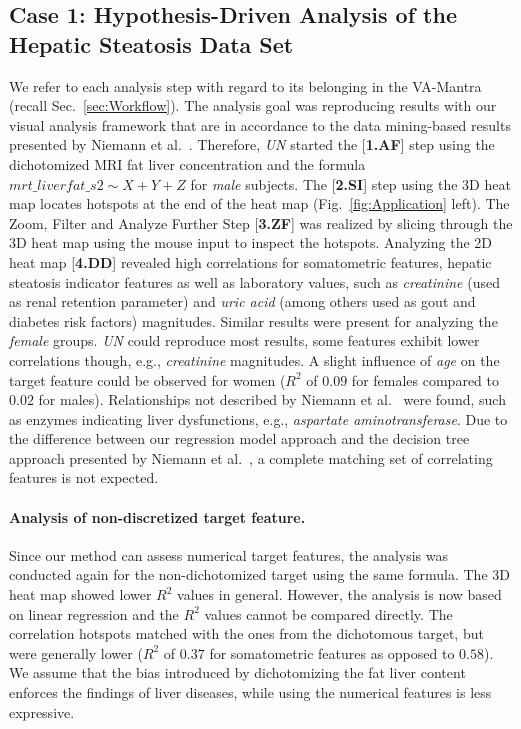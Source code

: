 \documentclass[journal]{style/vgtc} 			          %
\begin{document}
\subsection{Case 1: Hypothesis-Driven Analysis of the Hepatic Steatosis Data Set}
We refer to each analysis step with regard to its belonging in the VA-Mantra (recall Sec.~\ref{sec:Workflow}).
The analysis goal was reproducing results with our visual analysis framework that are in accordance to the data mining-based results presented by Niemann et al.~\cite{Niemann2014}.
Therefore, \emph{UN} started the [\textbf{1.AF}] step using the dichotomized MRI fat liver concentration and the formula $mrt\_liverfat\_s2 \sim X + Y + Z$ for \emph{male} subjects.
The [\textbf{2.SI}] step using the 3D heat map locates hotspots at the end of the heat map (Fig.~\ref{fig:Application} left).
The Zoom, Filter and Analyze Further Step [\textbf{3.ZF}] was realized by slicing through the 3D heat map using the mouse input to inspect the hotspots.
Analyzing the 2D heat map [\textbf{4.DD}] revealed high correlations for somatometric features, hepatic steatosis indicator features as well as laboratory values, such as \emph{creatinine} (used as renal retention parameter) and \emph{uric acid} (among others used as gout and diabetes risk factors) magnitudes.
Similar results were present for analyzing the \emph{female} groups.
\emph{UN} could reproduce most results, some features exhibit lower correlations though, e.g., \emph{creatinine} magnitudes.
A slight influence of \emph{age} on the target feature could be observed for women ($R^2$ of $0.09$ for females compared to $0.02$ for males).
Relationships not described by Niemann et al.~\cite{Niemann2014} were found, such as enzymes indicating liver dysfunctions, e.g., \emph{aspartate aminotransferase}.
%
Due to the difference between our regression model approach and the decision tree approach presented by Niemann et al.~\cite{Niemann2014}, a complete matching set of correlating features is not expected.

\paragraph{Analysis of non-discretized target feature.}
Since our method can assess numerical target features, the analysis was conducted again for the non-dichotomized target using the same formula.
The 3D heat map showed lower $R^2$ values in general.
However, the analysis is now based on linear regression and the $R^2$ values cannot be compared directly.
The correlation hotspots matched with the ones from the dichotomous target, but were generally lower ($R^2$ of $0.37$ for somatometric features as opposed to $0.58$).
We assume that the bias introduced by dichotomizing the fat liver content enforces the findings of liver diseases, while using the numerical features is less expressive.
\end{document}
